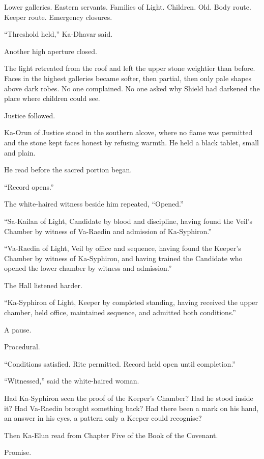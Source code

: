 Lower galleries.
Eastern servants.
Families of Light.
Children.
Old.
Body route.
Keeper route.
Emergency closures.\par
``Threshold held,'' Ka-Dhavar said.\par
Another high aperture closed.\par
The light retreated from the roof and left the upper stone weightier than before.
Faces in the highest galleries became softer, then partial, then only pale shapes above dark robes.
No one complained.
No one asked why Shield had darkened the place where children could see.\par
Justice followed.\par
Ka-Orun of Justice stood in the southern alcove, where no flame was permitted and the stone kept faces honest by refusing warmth.
He held a black tablet, small and plain.\par
He read before the sacred portion began.\par
``Record opens.''\par
The white-haired witness beside him repeated, ``Opened.''\par
``Sa-Kailan of Light, Candidate by blood and discipline, having found the Veil's Chamber by witness of Va-Raedin and admission of Ka-Syphiron.''\par
``Va-Raedin of Light, Veil by office and sequence, having found the Keeper's Chamber by witness of Ka-Syphiron, and having trained the Candidate who opened the lower chamber by witness and admission.''\par
The Hall listened harder.\par
``Ka-Syphiron of Light, Keeper by completed standing, having received the upper chamber, held office, maintained sequence, and admitted both conditions.''\par
A pause.\par
Procedural.\par
``Conditions satisfied.
Rite permitted.
Record held open until completion.''\par
``Witnessed,'' said the white-haired woman.\par
Had Ka-Syphiron seen the proof of the Keeper's Chamber?
Had he stood inside it?
Had Va-Raedin brought something back?
Had there been a mark on his hand, an answer in his eyes, a pattern only a Keeper could recognise?\par
Then Ka-Elun read from Chapter Five of the Book of the Covenant.\par
Promise.\par
